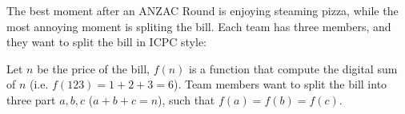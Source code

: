 The best moment after an ANZAC Round is enjoying steaming pizza, while the most annoying moment
is spliting the bill. Each team has three members, and they want to split the bill in ICPC
style:

Let $n$ be the price of the bill, $f(n)$ is a function that compute the digital sum of $n$
(i.e. $f(123) = 1 +  2 + 3 = 6$). Team members want to split the bill into three part $a,b,c$
($a+b+c=n$), such that $f(a) = f(b) = f(c)$.
